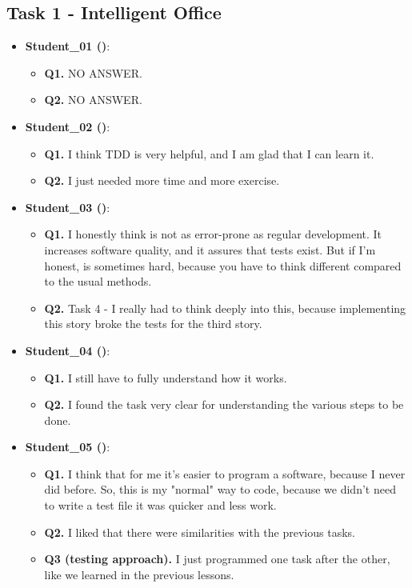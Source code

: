 \subsection{Task 1 - Intelligent Office}
\begin{itemize}
    \item \textbf{Student\_01 (\tdd)}: 
    \begin{itemize}
        \item \textbf{Q1.} NO ANSWER.
        \item \textbf{Q2.} NO ANSWER.
    \end{itemize}

    \item \textbf{Student\_02 (\tdd)}: 
    \begin{itemize}
        \item \textbf{Q1.} I think TDD is very helpful, and I am glad that I can learn it.
        \item \textbf{Q2.} I just needed more time and more exercise.
    \end{itemize}

    \item \textbf{Student\_03 (\tdd)}: 
    \begin{itemize}
        \item \textbf{Q1.} I honestly think \tdd is not as error-prone as regular development. It increases software quality, and it assures that tests exist. But if I'm honest, \tdd is sometimes hard, because you have to think different compared to the usual methods.
        \item \textbf{Q2.} Task 4 - I really had to think deeply into this, because implementing this story broke the tests for the third story.
    \end{itemize}

    \item \textbf{Student\_04 (\tdd)}: 
    \begin{itemize}
        \item \textbf{Q1.} I still have to fully understand how it works.
        \item \textbf{Q2.} I found the task very clear for understanding the various steps to be done.
    \end{itemize}

    \item \textbf{Student\_05 (\notdd)}: 
    \begin{itemize}
        \item \textbf{Q1.} I think that for me it's easier to program a \notdd software, because I never did \tdd before. So, this is my "normal" way to code, because we didn't need to write a test file it was quicker and less work.
        \item \textbf{Q2.} I liked that there were similarities with the previous tasks.
        \item \textbf{Q3 (\notdd testing approach).} I just programmed one task after the other, like we learned in the previous lessons. 
    \end{itemize}


\end{itemize}
